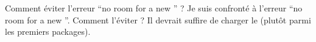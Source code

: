 \begin{dbfaq}{Comment éviter l'erreur \enquote{no room for a new
      \protect{}} ?}{}
  Je suis confronté à l'erreur \enquote{no room for a new
    }. Comment l'éviter ?
  \tcblower
  Il devrait suffire de charger le  (plutôt parmi les
  premiers packages).
\end{dbfaq}

%
\iffalse
\fi
